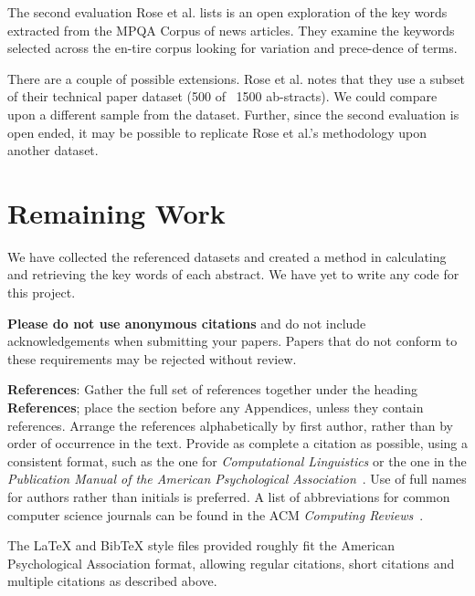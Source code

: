\documentclass[11pt,a4paper]{article}
\begin{document}
The second evaluation Rose et al. lists is an open exploration of the key words extracted from the MPQA Corpus of news articles. They examine the keywords selected across the en-tire corpus looking for variation and prece-dence of terms.   

There are a couple of possible extensions. Rose et al. notes that they use a subset of their technical paper dataset (500 of ~1500 ab-stracts).  We could compare upon a different sample from the dataset. Further, since the second evaluation is open ended, it may be possible to replicate Rose et al.’s methodology upon another dataset.


\section{Remaining Work}

We have collected the referenced datasets and created a method in calculating and retrieving the key words of each abstract. We have yet to write any code for this project.

\textbf{Please do not use anonymous citations} and do not include
acknowledgements when submitting your papers. Papers that do not
conform to these requirements may be rejected without review.

\textbf{References}: Gather the full set of references together under
the heading {\bf References}; place the section before any Appendices,
unless they contain references. Arrange the references alphabetically
by first author, rather than by order of occurrence in the text.
Provide as complete a citation as possible, using a consistent format,
such as the one for {\em Computational Linguistics\/} or the one in the 
{\em Publication Manual of the American 
Psychological Association\/}~\cite{APA:83}.  Use of full names for
authors rather than initials is preferred.  A list of abbreviations
for common computer science journals can be found in the ACM 
{\em Computing Reviews\/}~\cite{ACM:83}.

The \LaTeX{} and Bib\TeX{} style files provided roughly fit the
American Psychological Association format, allowing regular citations, 
short citations and multiple citations as described above.

%
%



\appendix
\end{document}
